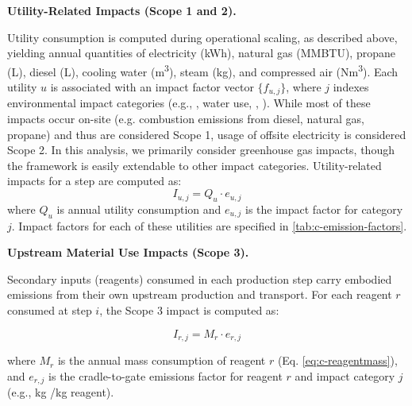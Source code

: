 \documentclass{article}
\renewcommand\_{\textunderscore\allowbreak}
\begin{document}
\medskip
\noindent\textbf{Utility-Related Impacts (Scope 1 and 2).}\quad

Utility consumption is computed during operational scaling, as described above, yielding annual quantities of electricity (kWh), natural gas (MMBTU), propane (L), diesel (L), cooling water (\si{m^3}), steam (kg), and compressed air (\si{Nm^3}). Each utility $u$ is associated with an impact factor vector $\{f_{u,j}\}$, where $j$ indexes environmental impact categories (e.g., , water use, , ). While most of these impacts occur on-site (e.g. combustion emissions from diesel, natural gas, propane) and thus are considered Scope 1, usage of offsite electricity is considered Scope 2. In this analysis, we primarily consider greenhouse gas impacts, though the framework is easily extendable to other impact categories. Utility-related impacts for a step are computed as:
\begin{equation}
    I_{u,j} = Q_u \cdot e_{u,j}
\end{equation}
where $Q_u$ is annual utility consumption and $e_{u,j}$ is the impact factor for category $j$. Impact factors for each of these utilities are specified in \ref{tab:c-emission-factors}. 

\medskip
\noindent\textbf{Upstream Material Use Impacts (Scope 3).}\quad

Secondary inputs (reagents) consumed in each production step carry embodied emissions from their own upstream production and transport. For each reagent $r$ consumed at step $i$, the Scope 3 impact is computed as:

\begin{equation}
    I_{r,j} = M_r \cdot e_{r,j}
\end{equation}

where $M_r$ is the annual mass consumption of reagent $r$ (Eq. \ref{eq:c-reagentmass}), and $e_{r,j}$ is the cradle-to-gate emissions factor for reagent $r$ and impact category $j$ (e.g., kg /kg reagent).
\end{document}
